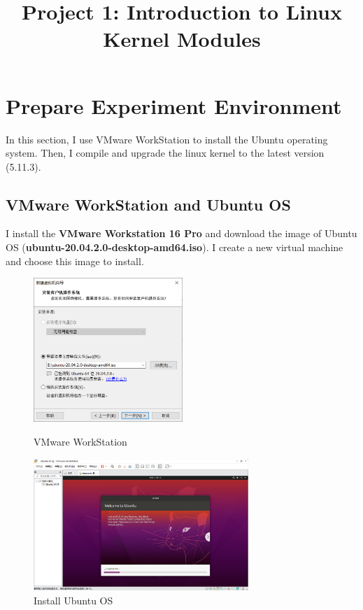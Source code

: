 \documentclass[UTF8,10pt,a4paper]{article}
\title{Project 1: Introduction to Linux Kernel Modules}
\date{}
\theoremstyle{Problem}
\theoremstyle{Solution}
\begin{document}
\maketitle
\thispagestyle{FirstPageStyle}
\section{Prepare Experiment Environment}
In this section, I use VMware WorkStation to install the Ubuntu operating system. Then, I compile and upgrade the linux kernel to the latest version (5.11.3).
\subsection{VMware WorkStation and Ubuntu OS}
I install the \textbf{VMware Workstation 16 Pro} and download the image of Ubuntu OS (\textbf{ubuntu-20.04.2.0-desktop-amd64.iso}). I create a new virtual machine and choose this image to install.

\begin{figure}[H]
\begin{minipage}[H]{0.5\linewidth}
    \centering
    \includegraphics[width=160pt]{1.png}
    \caption{VMware WorkStation}
    \label{1}
\end{minipage}
\begin{minipage}[H]{0.5\linewidth}
    \centering
    \includegraphics[width=230pt]{2.png}
    \caption{Install Ubuntu OS}
    \label{2}
\end{minipage}
\end{figure}
\end{document}

